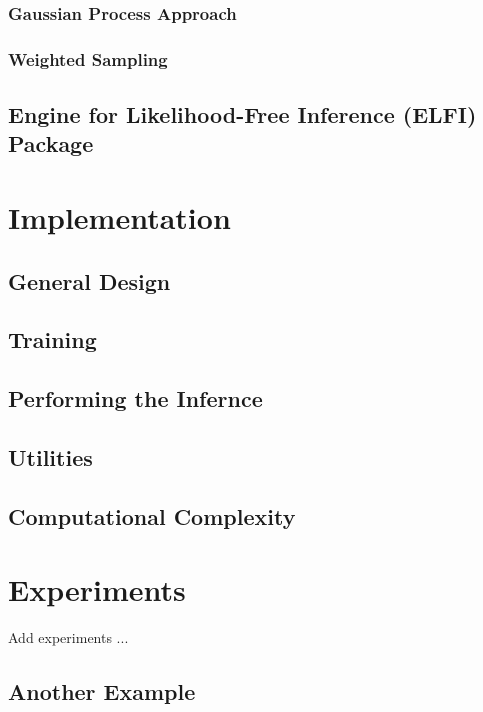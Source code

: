 \documentclass[11pt,twoside]{article}
\numberwithin{Theorem}{section}
\numberwithin{Definition}{section}
\numberwithin{Lemma}{section}
\numberwithin{Algorithm}{section}
\numberwithin{equation}{section}
\begin{document}
\subsubsection{Gaussian Process Approach}

\subsubsection{Weighted Sampling}

\subsection{Engine for Likelihood-Free Inference (ELFI) Package}
\clearpage


\section{Implementation}

\subsection{General Design}

\subsection{Training}

\subsection{Performing the Infernce}

\subsection{Utilities}

\subsection{Computational Complexity}

\clearpage
\section{Experiments}
Add experiments ...

\subsection{Another Example}
\end{document}
